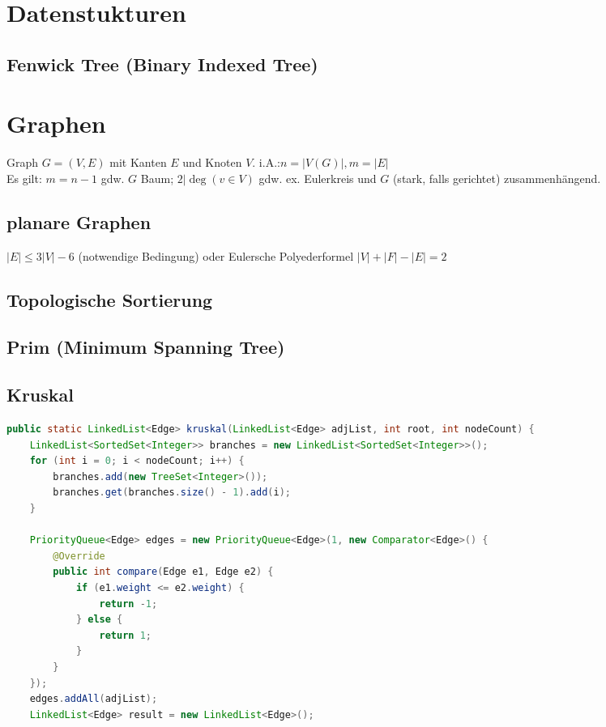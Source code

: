 \documentclass[10pt,a4paper,ngerman,oneside,]{article}
\begin{document}
\begin{multicols}{2}
\section{Datenstukturen}
\subsection{Fenwick Tree (Binary Indexed Tree)}
\section{Graphen}
Graph $G=(V,E)$ mit Kanten $E$ und Knoten $V$. i.A.:$n=|V(G)|, m=|E|$\\
Es gilt: $m=n-1$ gdw. $G$ Baum; $2|\deg(v\in V)$ gdw. ex. Eulerkreis und $G$ (stark, falls gerichtet) zusammenhängend.
\subsection{planare Graphen}
$|E|\leq3|V|-6$ (notwendige Bedingung)
oder Eulersche Polyederformel $|V|+|F|-|E|=2$
\subsection{Topologische Sortierung}
\subsection{Prim (Minimum Spanning Tree)}

\subsection{Kruskal}
\begin{lstlisting}[language=java]
public static LinkedList<Edge> kruskal(LinkedList<Edge> adjList, int root, int nodeCount) {
	LinkedList<SortedSet<Integer>> branches = new LinkedList<SortedSet<Integer>>();
	for (int i = 0; i < nodeCount; i++) {
		branches.add(new TreeSet<Integer>());
		branches.get(branches.size() - 1).add(i);
	}

	PriorityQueue<Edge> edges = new PriorityQueue<Edge>(1, new Comparator<Edge>() {
		@Override
		public int compare(Edge e1, Edge e2) {
			if (e1.weight <= e2.weight) {
				return -1;
			} else {
				return 1;
			}
		}
	});
	edges.addAll(adjList);
	LinkedList<Edge> result = new LinkedList<Edge>();


\end{lstlisting}
\end{multicols}
\end{document}
